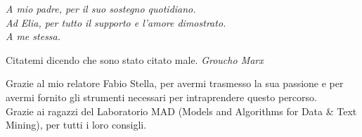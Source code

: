 \documentclass[11pt,cucitura,twoside]{toptesi}
\begin{document}
	





\frontmatter

\begin{flushright}
\noindent
\textit{A mio padre, per il suo sostegno quotidiano.}\\
\textit{Ad Elia, per tutto il supporto e l'amore dimostrato.} \\
\textit{A me stessa.}
\end{flushright}
\cleardoublepage


\begin{flushright}
\noindent
Citatemi dicendo che sono stato citato male.
\textit{Groucho Marx}
\end{flushright}

\cleardoublepage


\ringraziamenti
Grazie al mio relatore Fabio Stella, per avermi trasmesso la sua passione e per avermi fornito gli strumenti necessari per intraprendere questo percorso.\\ 
Grazie ai ragazzi del Laboratorio MAD (Models and Algorithms for Data \& Text Mining), per tutti i loro consigli.


\sommario
\end{document}

